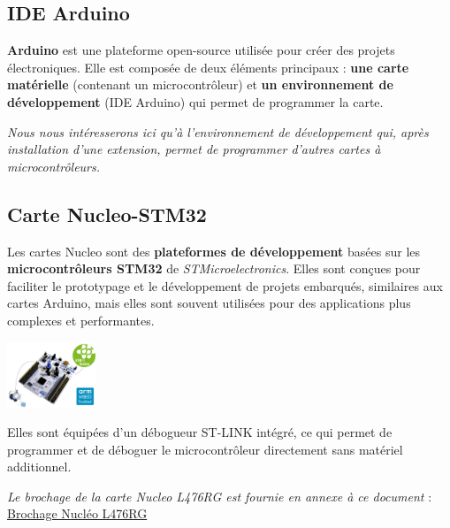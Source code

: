 \documentclass[a4paper,11pt,titlepage]{article} %
\begin{document}
\subsection{IDE Arduino}

\textbf{Arduino} est une plateforme open-source utilisée pour créer des projets électroniques. Elle est composée de deux éléments principaux : \textbf{une carte matérielle} (contenant un microcontrôleur) et \textbf{un environnement de développement} (IDE Arduino) qui permet de programmer la carte.


\textit{Nous nous intéresserons ici qu'à l'environnement de développement qui, après installation d'une extension, permet de programmer d'autres cartes à microcontrôleurs.}


\subsection{Carte Nucleo-STM32}

Les cartes Nucleo sont des \textbf{plateformes de développement} basées sur les \textbf{microcontrôleurs STM32} de \textit{STMicroelectronics}. Elles sont conçues pour faciliter le prototypage et le développement de projets embarqués, similaires aux cartes Arduino, mais elles sont souvent utilisées pour des applications plus complexes et performantes.


\begin{center}
	\includegraphics[width=0.2\textwidth]{images/nucleo_board.jpg}
\end{center}

Elles sont équipées d'un débogueur ST-LINK intégré, ce qui permet de programmer et de déboguer le microcontrôleur directement sans matériel additionnel.

\textsl{Le brochage de la carte Nucleo L476RG est fournie en annexe à ce document} : \hyperref[doc:nucleo_pins_476RG]{Brochage Nucléo L476RG}


\end{document}
